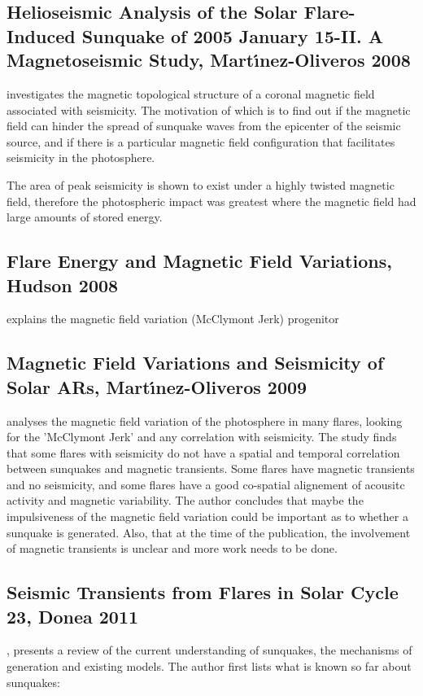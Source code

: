 \subsection{Helioseismic Analysis of the Solar Flare-Induced Sunquake of 2005 January 15-II. A Magnetoseismic Study, Mart{\'{\i}}nez-Oliveros 2008}
\cite{2008MNRAS.389.1905M} investigates the magnetic topological structure of a coronal magnetic field associated with seismicity. The motivation of which is to find out if the magnetic field can hinder the spread of sunquake waves from the epicenter of the seismic source, and if there is a particular magnetic field configuration that facilitates seismicity in the photosphere.
 
The area of peak seismicity is shown to exist under a highly twisted magnetic field, therefore the photospheric impact was greatest where the magnetic field had large amounts of stored energy.  



\subsection{Flare Energy and Magnetic Field Variations, Hudson 2008}
\cite{2008ASPC..383..221H} explains the magnetic field variation (McClymont Jerk) progenitor



\subsection{Magnetic Field Variations and Seismicity of Solar ARs, Mart{\'{\i}}nez-Oliveros 2009 }
\cite{2009MNRAS.395L..39M} analyses the magnetic field variation of the photosphere in many flares, looking for the 'McClymont Jerk' and any correlation with seismicity. The study finds that some flares with seismicity do not have a spatial and temporal correlation between sunquakes and magnetic transients. Some flares have magnetic transients and no seismicity, and some flares have a good co-spatial alignement of acousitc activity and magnetic variability. The author concludes that maybe the impulsiveness of the magnetic field variation could be important as to whether a sunquake is generated. Also, that at the time of the publication, the involvement of magnetic transients is unclear and more work needs to be done.



\subsection{Seismic Transients from Flares in Solar Cycle 23, Donea 2011}
\cite{2011SSRv..158..451D}, presents a review of the current understanding of sunquakes, the mechanisms of generation and existing models. The author first lists what is known so far about sunquakes:

